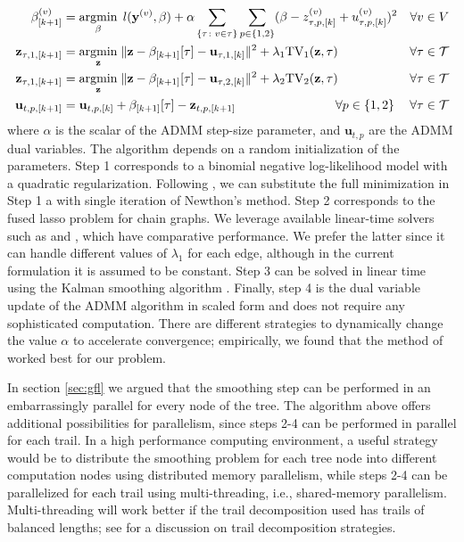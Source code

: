 \documentclass[a4paper, 11pt]{article}
\begin{document}
\begin{equation}\label{eq:algo}
\begin{aligned}
\beta^{(v)}_{[k + 1]} &= \operatornamewithlimits{argmin}_{\beta} \; l(\mathbf{y}^{(v)}, \beta) + \alpha \sum_{\{\tau \colon v \in \tau\}} \sum_{p\in\{1,2\}} (\beta - z_{{\tau, p, [k]}}^{(v)} + u_{{\tau, p, [k]}}^{(v)})^2  & \forall v\in V \\
\mathbf{z}_{{\tau, 1, [k + 1]}} &= \operatornamewithlimits{argmin}_{\mathbf{z}} \; \lVert \mathbf{z} - \beta_{[k + 1]}[\tau] - \mathbf{u}_{{\tau, 1, [k]}}\rVert^2  + \lambda_1\mathrm{TV}_1(\mathbf{z}, \tau) \, & \forall \tau \in \mathcal{T} \\
\mathbf{z}_{{\tau, 1, [k + 1]}} &= \operatornamewithlimits{argmin}_{\mathbf{z}} \; \lVert \mathbf{z} - \beta_{[k + 1]}[\tau] - \mathbf{u}_{{\tau, 2, [k]}}\rVert^2  + \lambda_2\mathrm{TV}_2(\mathbf{z}, \tau) \, & \forall \tau \in \mathcal{T} \\
\mathbf{u}_{{t,p, [k+1]}} &= \mathbf{u}_{{t,p, [k]}} + \beta_{[k+1]}[\tau] - \mathbf{z}_{t,p, [k+1]}  \hspace{8em} \forall  p\in\{1,2\}  & \forall \tau \in \mathcal{T}
\end{aligned}
\end{equation}
where $\alpha$ is the scalar of the ADMM step-size parameter, and $\mathbf{u}_{t,p}$ are the ADMM dual variables. The algorithm depends on a random initialization of the parameters. Step 1 corresponds to a binomial negative log-likelihood model with a quadratic regularization. Following \citet{tansey-etal-2017}, we can substitute the full minimization in Step 1 a with single iteration of Newthon's method. Step 2 corresponds to the fused lasso problem for chain graphs. We leverage available linear-time solvers such as \citep{johnson-2013} and \citep{barbero-sra-2018}, which have comparative performance. We prefer the latter since it can handle different values of $\lambda_1$ for each edge, although in the current formulation it is assumed to be constant. Step 3 can be solved in linear time using the Kalman smoothing algorithm \citep[see]{welch-1995}. Finally, step 4 is the dual variable update of the ADMM algorithm in scaled form and does not require any sophisticated computation. There are different strategies to dynamically change the value $\alpha$ to accelerate convergence; empirically, we found that the method of \citet{wohlberg2017admm} worked best for our problem.

In section \ref{sec:gfl} we argued that the smoothing step can be performed in an embarrassingly parallel for every node of the tree. The algorithm above offers additional possibilities for parallelism, since steps 2-4 can be performed in parallel for each trail. In a high performance computing environment, a useful strategy would be to distribute the smoothing problem for each tree node into different computation nodes using distributed memory parallelism, while steps 2-4 can be parallelized for each trail using multi-threading, i.e., shared-memory parallelism. Multi-threading will work better if the trail decomposition used has trails of balanced lengths; see \citep{tansey-scott-2015} for a discussion on trail decomposition strategies.
\end{document}
